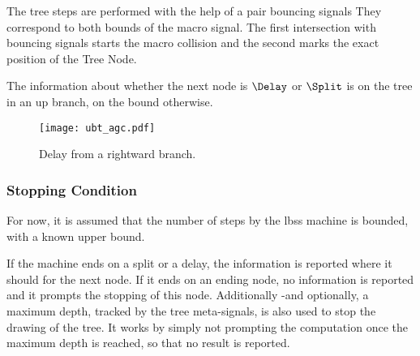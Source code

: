 The tree steps are performed with the help of a pair bouncing signals
They correspond to both bounds of the macro signal.
The first intersection with bouncing signals starts the macro collision and the second marks the exact position of the Tree Node.

The information about whether the next node is $\Delay$ or $\Split$ is on the tree in an up branch, on the bound otherwise.


\begin{figure}[hbt]
	\centering
	\small%
	\texttt{[image: ubt\_agc.pdf]}%
	\caption{Delay from a rightward branch.}
	\label{fig:ubtagc:example1}
\end{figure}

\subsubsection{Stopping Condition}
For now, it is assumed that the number of steps by the lbss machine is bounded, with a known upper bound.

If the machine ends on a split or a delay, the information is reported where  it should for the next node.
If it ends on an ending node, no information is reported and it prompts the stopping of this node.
Additionally -and optionally, a maximum depth, tracked by the tree meta-signals, is also used to stop the drawing of the tree.
It works by simply not prompting the computation once the maximum depth is reached, so that no result is reported.

